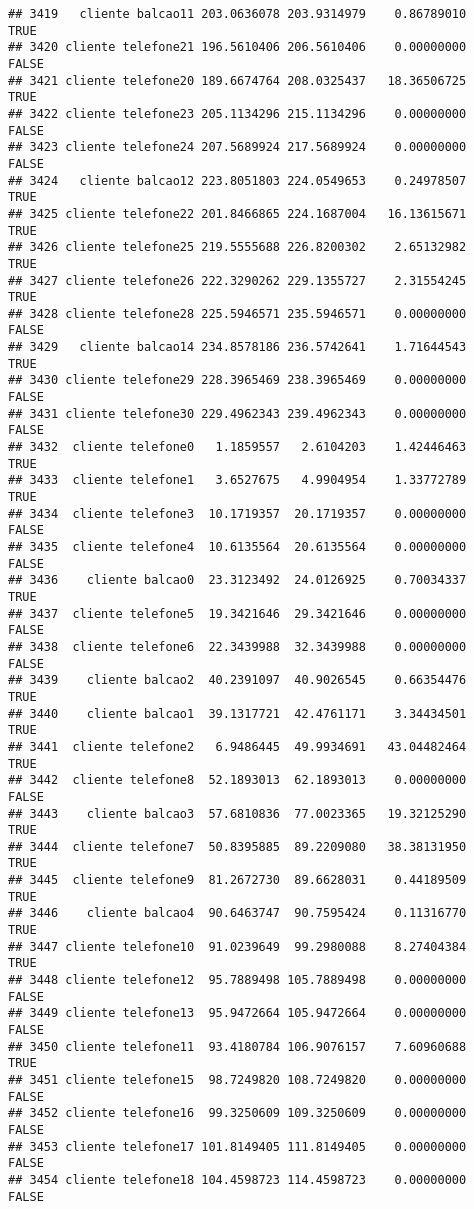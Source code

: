 \documentclass[
]{article}
\begin{document}
\begin{verbatim}
## 3419   cliente balcao11 203.0636078 203.9314979    0.86789010     TRUE
## 3420 cliente telefone21 196.5610406 206.5610406    0.00000000    FALSE
## 3421 cliente telefone20 189.6674764 208.0325437   18.36506725     TRUE
## 3422 cliente telefone23 205.1134296 215.1134296    0.00000000    FALSE
## 3423 cliente telefone24 207.5689924 217.5689924    0.00000000    FALSE
## 3424   cliente balcao12 223.8051803 224.0549653    0.24978507     TRUE
## 3425 cliente telefone22 201.8466865 224.1687004   16.13615671     TRUE
## 3426 cliente telefone25 219.5555688 226.8200302    2.65132982     TRUE
## 3427 cliente telefone26 222.3290262 229.1355727    2.31554245     TRUE
## 3428 cliente telefone28 225.5946571 235.5946571    0.00000000    FALSE
## 3429   cliente balcao14 234.8578186 236.5742641    1.71644543     TRUE
## 3430 cliente telefone29 228.3965469 238.3965469    0.00000000    FALSE
## 3431 cliente telefone30 229.4962343 239.4962343    0.00000000    FALSE
## 3432  cliente telefone0   1.1859557   2.6104203    1.42446463     TRUE
## 3433  cliente telefone1   3.6527675   4.9904954    1.33772789     TRUE
## 3434  cliente telefone3  10.1719357  20.1719357    0.00000000    FALSE
## 3435  cliente telefone4  10.6135564  20.6135564    0.00000000    FALSE
## 3436    cliente balcao0  23.3123492  24.0126925    0.70034337     TRUE
## 3437  cliente telefone5  19.3421646  29.3421646    0.00000000    FALSE
## 3438  cliente telefone6  22.3439988  32.3439988    0.00000000    FALSE
## 3439    cliente balcao2  40.2391097  40.9026545    0.66354476     TRUE
## 3440    cliente balcao1  39.1317721  42.4761171    3.34434501     TRUE
## 3441  cliente telefone2   6.9486445  49.9934691   43.04482464     TRUE
## 3442  cliente telefone8  52.1893013  62.1893013    0.00000000    FALSE
## 3443    cliente balcao3  57.6810836  77.0023365   19.32125290     TRUE
## 3444  cliente telefone7  50.8395885  89.2209080   38.38131950     TRUE
## 3445  cliente telefone9  81.2672730  89.6628031    0.44189509     TRUE
## 3446    cliente balcao4  90.6463747  90.7595424    0.11316770     TRUE
## 3447 cliente telefone10  91.0239649  99.2980088    8.27404384     TRUE
## 3448 cliente telefone12  95.7889498 105.7889498    0.00000000    FALSE
## 3449 cliente telefone13  95.9472664 105.9472664    0.00000000    FALSE
## 3450 cliente telefone11  93.4180784 106.9076157    7.60960688     TRUE
## 3451 cliente telefone15  98.7249820 108.7249820    0.00000000    FALSE
## 3452 cliente telefone16  99.3250609 109.3250609    0.00000000    FALSE
## 3453 cliente telefone17 101.8149405 111.8149405    0.00000000    FALSE
## 3454 cliente telefone18 104.4598723 114.4598723    0.00000000    FALSE

\end{verbatim}
\end{document}
